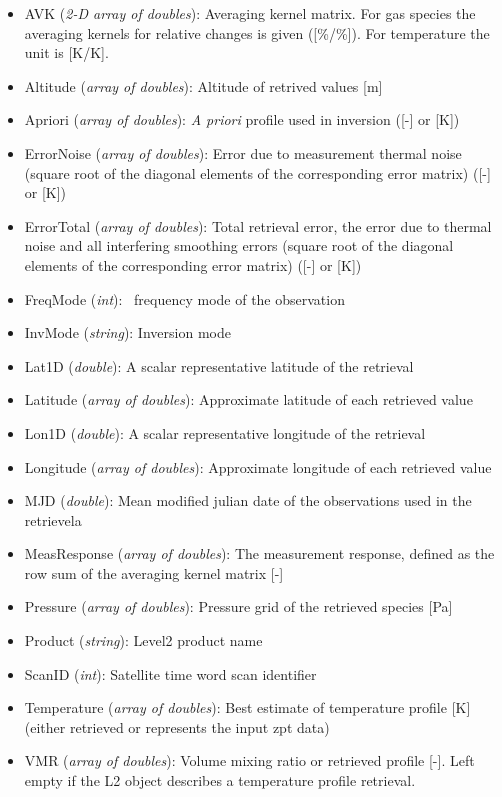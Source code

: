 \begin{itemize}

    \item AVK (\emph{2-D array of doubles}): Averaging kernel matrix. For
      gas species the averaging kernels for relative changes is given
      ([\%/\%]). For temperature the unit is [K/K].
    \item Altitude (\emph{array of doubles}): Altitude of retrived values [m]
    \item Apriori (\emph{array of doubles}): \textit{A priori} profile used in
      inversion ([-] or [K])
    \item ErrorNoise (\emph{array of doubles}): Error due to measurement
      thermal noise (square root of the diagonal elements of the corresponding
      error matrix) ([-] or [K])
    \item ErrorTotal (\emph{array of doubles}): Total retrieval error, the
      error due to thermal noise and all interfering smoothing errors (square
      root of the diagonal elements of the corresponding error matrix) ([-]
      or [K])
    \item FreqMode (\emph{int}): \smr\ frequency mode of the observation
    \item InvMode (\emph{string}): Inversion mode
    \item Lat1D (\emph{double}): A scalar representative latitude of the retrieval
    \item Latitude  (\emph{array of doubles}): Approximate latitude of each
      retrieved value
    \item Lon1D (\emph{double}): A scalar representative longitude of the retrieval
    \item Longitude  (\emph{array of doubles}): Approximate longitude of each
      retrieved value
    \item MJD (\emph{double}): Mean modified julian date of the observations
      used in the retrievela
    \item MeasResponse (\emph{array of doubles}): The measurement response, defined
      as the row sum of the averaging kernel matrix [-]
    \item Pressure (\emph{array of doubles}): Pressure grid of the retrieved species [Pa]
    \item Product (\emph{string}): Level2 product name
    \item ScanID (\emph{int}): Satellite time word scan identifier
    \item Temperature (\emph{array of doubles}): Best estimate of temperature
      profile [K] (either retrieved or represents the input zpt data)
    \item VMR (\emph{array of doubles}): Volume mixing ratio or retrieved
      profile [-]. Left empty if the L2 object describes a temperature profile
      retrieval.

\end{itemize}

